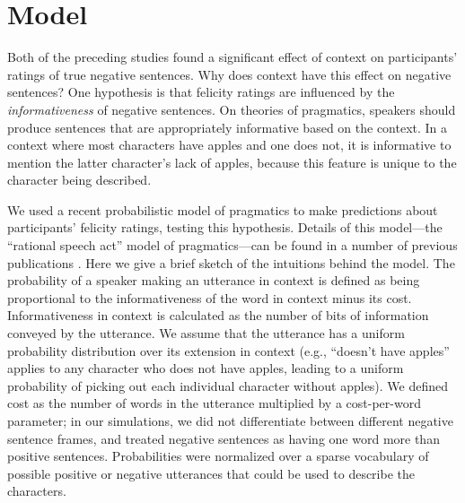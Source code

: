 \documentclass[10pt,letterpaper]{article}
\begin{document}
\section{Model}

Both of the preceding studies found a significant effect of context on participants' ratings of true negative sentences.  Why does context have this effect on negative sentences?  One hypothesis is that felicity ratings are influenced by the \emph{informativeness} of negative sentences. On theories of pragmatics, speakers should produce sentences that are appropriately informative based on the context.  In a context where most characters have apples and one does not, it is informative to mention the latter character's lack of apples, because this feature is unique to the character being described.

We used a recent probabilistic model of pragmatics to make predictions about participants' felicity ratings, testing this hypothesis. Details of this model---the ``rational speech act'' model of pragmatics---can be found in a number of previous publications \cite{frank2012,goodman2013,nordmeyer2014}. Here we give a brief sketch of the intuitions behind the model. The probability of a speaker making an utterance in context is defined as being  proportional to the informativeness of the word in context minus its cost.  Informativeness in context is calculated as the number of bits of information conveyed by the utterance.  We assume that the utterance has a uniform probability distribution over its extension in context (e.g., ``doesn't have apples'' applies to any character who does not have apples, leading to a uniform probability of picking out each individual character without apples). We defined cost as the number of words in the utterance multiplied by a cost-per-word parameter; in our simulations, we did not differentiate between different negative sentence frames, and treated negative sentences as having one word more than positive sentences.  Probabilities were normalized over a sparse vocabulary of possible positive or negative utterances that could be used to describe the characters.
\end{document}
